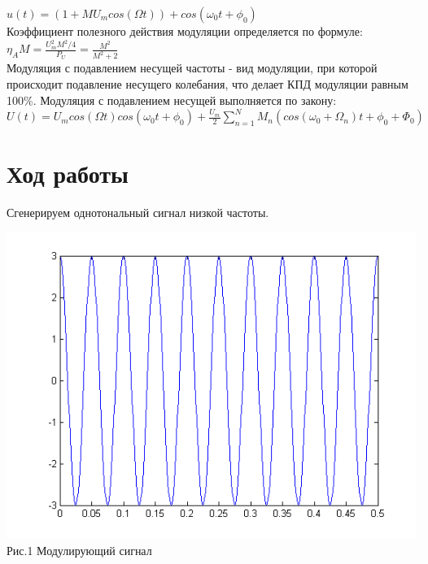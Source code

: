 \documentclass[a4paper]{article}
\begin{document}
$u(t)=(1+MU_mcos(\Omega t))+cos(\omega_0t+\phi_0)$\\

Коэффициент полезного действия модуляции определяется по формуле:\\

$\eta_AM=\frac{U_m^2M^2/4}{P_U}=\frac{M^2}{M^2+2}$\\

Модуляция с подавлением несущей частоты - вид модуляции, при которой происходит подавление несущего колебания, что делает КПД модуляции равным 100\%. Модуляция с подавлением несущей выполняется по закону:\\

$U(t)=U_mcos(\Omega t)cos(\omega_0t+\phi_0)+\frac{U_m}{2}\sum_{n=1}^{N}M_n(cos(\omega_0+\Omega_n)t+\phi_0+\Phi_0)$\\

\section{Ход работы}
Сгенерируем однотональный сигнал низкой частоты.

\begin{center}
	\includegraphics[scale = 0.7]{sign.png} \\Рис.1 Модулирующий сигнал
\end{center}
\end{document}
